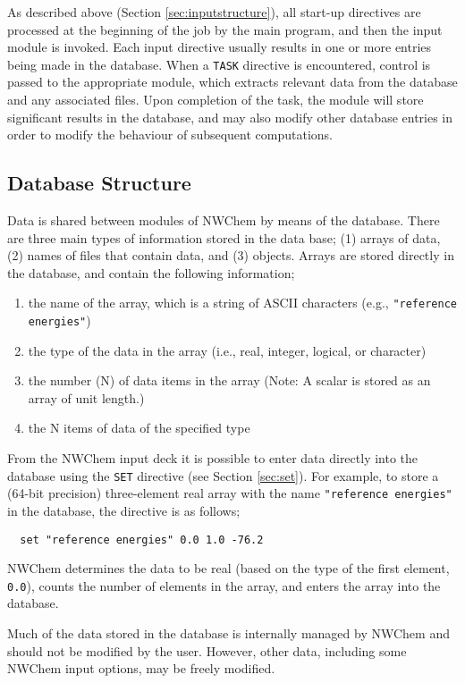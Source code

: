 As described above (Section \ref{sec:inputstructure}), all
start-up directives are processed at the beginning of the job
by the main program, and
then the input module is invoked.  Each input directive usually
results in one or more entries being made in the database.  When a
\verb+TASK+ directive is encountered, control is passed to the
appropriate module, which extracts relevant data from the database and
any associated files.  Upon completion of the task, the module will store
significant results in the database, and may also modify other
database entries in order to modify the behaviour of subsequent
computations.

\subsection{Database Structure}
\label{sec:database}

Data is shared between modules of NWChem by means of the database.  There
are three main types of information stored in the data base; (1) arrays of
data, (2) names of files that contain data, and (3) objects.  
Arrays are stored directly in the database, and contain the following
information;
\begin{enumerate}
\item the name of the array, which is a string of ASCII characters (e.g., 
      \verb+"reference energies"+)
\item the type of the data in the array 
(i.e., real, integer, logical, or character) 
\item the number (N) of data items in the array (Note: A scalar is stored as an array of unit length.)
\item the N items of data of the specified type
\end{enumerate}


From the NWChem input deck it is possible to enter data directly into
the database using the \verb+SET+ directive (see Section
\ref{sec:set}).  For example, to store a (64-bit precision)
three-element real array with the name \verb+"reference energies"+ in
the database, the directive is as follows;
\begin{verbatim}
  set "reference energies" 0.0 1.0 -76.2
\end{verbatim}
NWChem determines the data to be real (based on the type of the first
element, \verb+0.0+), counts the number
of elements in the array, and enters the array into the database.

Much of the data stored in the database is internally managed by
NWChem and should not be modified by the user.  However, other data,
including some NWChem input options, may be freely modified.  

